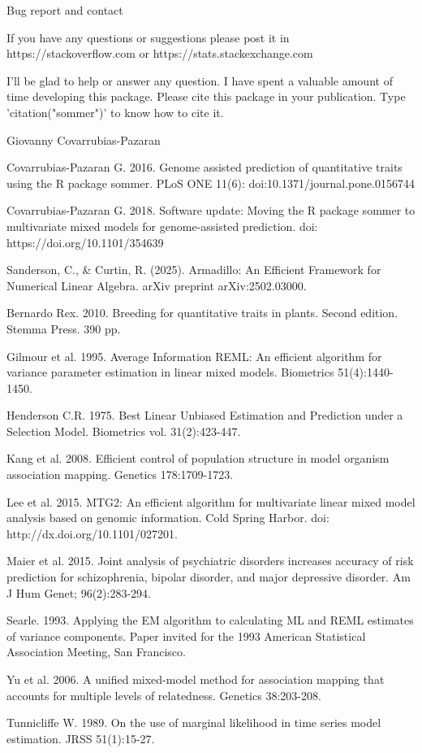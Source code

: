 \documentclass[a4paper]{book}
\begin{document}
%
\begin{Section}{Bug report and contact}

If you have any questions or suggestions please post it in https://stackoverflow.com or https://stats.stackexchange.com

I'll be glad to help or answer any question. I have spent a valuable amount of time developing this package. Please cite this package in your publication. Type 'citation("sommer")' to know how to cite it.


\end{Section}
%
\begin{Author}\relax
Giovanny Covarrubias-Pazaran
\end{Author}
%
\begin{References}\relax

Covarrubias-Pazaran G. 2016. Genome assisted prediction of quantitative traits using the R package sommer. PLoS ONE 11(6): doi:10.1371/journal.pone.0156744 

Covarrubias-Pazaran G. 2018. Software update: Moving the R package sommer to multivariate mixed models for genome-assisted prediction. doi: https://doi.org/10.1101/354639

Sanderson, C., \& Curtin, R. (2025). Armadillo: An Efficient Framework for Numerical Linear Algebra. arXiv preprint arXiv:2502.03000.

Bernardo Rex. 2010. Breeding for quantitative traits in plants. Second edition. Stemma Press. 390 pp.

Gilmour et al. 1995. Average Information REML: An efficient algorithm for variance parameter estimation in linear mixed models. Biometrics 51(4):1440-1450.

Henderson C.R. 1975. Best Linear Unbiased Estimation and Prediction under a Selection Model. Biometrics vol. 31(2):423-447.

Kang et al. 2008. Efficient control of population structure in model organism association mapping. Genetics 178:1709-1723.

Lee et al. 2015. MTG2: An efficient algorithm for multivariate linear mixed model analysis based on genomic information. Cold Spring Harbor. doi: http://dx.doi.org/10.1101/027201.

Maier et al. 2015. Joint analysis of psychiatric disorders increases accuracy of risk prediction for schizophrenia, bipolar disorder, and major depressive disorder. Am J Hum Genet; 96(2):283-294.

Searle. 1993. Applying the EM algorithm to calculating ML and REML estimates of variance components. Paper invited for the 1993 American Statistical Association Meeting, San Francisco.

Yu et al. 2006. A unified mixed-model method for association mapping that accounts for multiple levels of relatedness. Genetics 38:203-208.

Tunnicliffe W. 1989. On the use of marginal likelihood in time series model estimation. JRSS 51(1):15-27.

\end{References}
\end{document}
